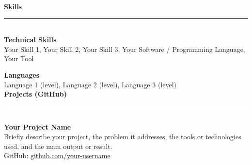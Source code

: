 \documentclass[11pt,a4paper]{article}
\newcommand{\cvsection}[1]{%
  \vspace{0pt}%
  {\large\bfseries\color{SoftBlue} #1}\\[-2ex]%
  {\color{SoftBlue}\rule{\linewidth}{0.4pt}}\\[0.2ex]%
}
\begin{document}
\cvsection{Skills}
\textbf{Technical Skills}\\[-2pt]
Your Skill 1, Your Skill 2, Your Skill 3, Your Software / Programming Language, Your Tool

\vspace{4pt}
\textbf{Languages}\\[-2pt]
Language 1 (level),
Language 2 (level),
Language 3 (level)\\[-2pt]

\cvsection{Projects (GitHub)}
\textbf{Your Project Name}\\[-2pt]
Briefly describe your project, the problem it addresses, the tools or technologies used, and the main output or result.\\[-5pt]

GitHub: \href{https://github.com/your-username}{github.com/your-username}
\end{document}

